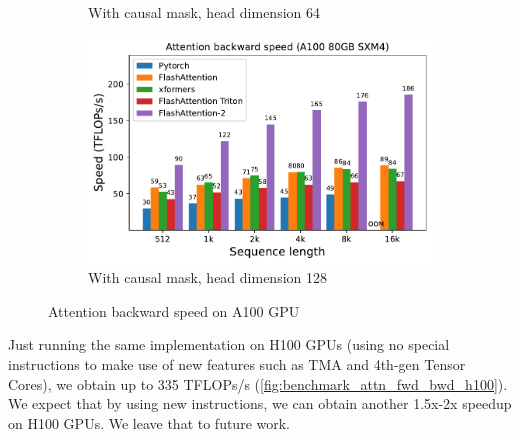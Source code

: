 \begin{figure}[ht]
\begin{subfigure}{.5\textwidth}
    \caption{With causal mask, head dimension 64}
  \end{subfigure}%
  \begin{subfigure}{.5\textwidth}
    \centering
    \includegraphics[width=.95\linewidth]{figs/flash2_causal_True_hdim_128_bwd_speed.pdf}
    \caption{With causal mask, head dimension 128}
  \end{subfigure}
  \caption{Attention backward speed on A100 GPU}
  \label{fig:benchmark_attn_bwd}
\end{figure}

Just running the same implementation on H100 GPUs (using no special instructions
to make use of new features such as TMA and 4th-gen Tensor Cores), we obtain up
to 335 TFLOPs/s (\cref{fig:benchmark_attn_fwd_bwd_h100}).
We expect that by using new instructions, we can obtain another 1.5x-2x speedup
on H100 GPUs. We leave that to future work.

